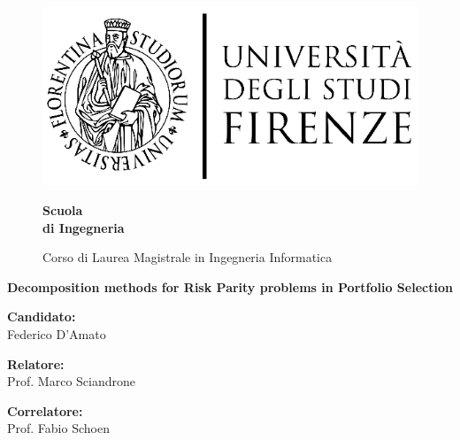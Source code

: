 \begin{figure}[htbp]
\begin{minipage}{0.3\textwidth}
\centering
\includegraphics[scale=0.8]{logo_universita.eps}
\end{minipage}
\hspace{0.3\textwidth}
\begin{minipage}{0.4\textwidth}
\centering
\begin{flushright}
{\Large \textbf{Scuola\\
 di Ingegneria \\}
}
\end{flushright}
\begin{flushright}
Corso di Laurea Magistrale in Ingegneria Informatica
\end{flushright}
\end{minipage}

\end{figure}


\vspace{35mm}
\begin{center}

 {\huge {\bf Decomposition methods for Risk Parity problems in Portfolio Selection}
 }

\end{center}
\vspace{55mm}

\noindent
{\Large \textbf{Candidato:}}\\
\noindent
{\LARGE Federico D'Amato\\}

\begin{minipage}{0.5\textwidth}
{\Large \textbf{Relatore:}\\}
{\LARGE Prof. Marco Sciandrone
}
\end{minipage}
\begin{minipage}{0.5\textwidth}
\begin{flushright}
{\Large \textbf{Correlatore:}\\}
{\LARGE Prof. Fabio Schoen}
\end{flushright}
\end{minipage}
\vfill

